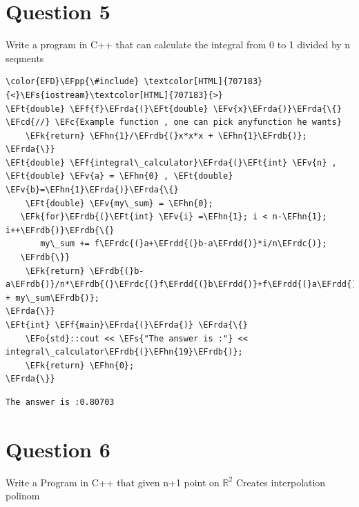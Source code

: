 \documentclass[11pt]{article}
\newcommand{\EFc}[1]{\textcolor{EFc}{#1}} %
\newcommand{\EFcd}[1]{\textcolor{EFcd}{#1}} %
\newcommand{\EFs}[1]{\textcolor{EFs}{#1}} %
\newcommand{\EFk}[1]{\textcolor{EFk}{#1}} %
\newcommand{\EFf}[1]{\textcolor{EFf}{#1}} %
\newcommand{\EFv}[1]{\textcolor{EFv}{#1}} %
\newcommand{\EFt}[1]{\textcolor{EFt}{#1}} %
\newcommand{\EFo}[1]{\textcolor{EFo}{#1}} %
\newcommand{\EFpp}[1]{\textcolor{EFpp}{#1}} %
\newcommand{\EFhn}[1]{\textcolor{EFhn}{#1}} %
\newcommand{\EFrda}[1]{\textcolor{EFrda}{#1}} %
\newcommand{\EFrdb}[1]{\textcolor{EFrdb}{#1}} %
\newcommand{\EFrdc}[1]{\textcolor{EFrdc}{#1}} %
\newcommand{\EFrdd}[1]{\textcolor{EFrdd}{#1}} %
\begin{document}
\newpage
\section{Question 5}
\label{sec:org77fab99}
Write a program in C++ that can calculate the integral from 0 to 1 divided by n seqments

\begin{Code}
\begin{Verbatim}
\color{EFD}\EFpp{\#include} \textcolor[HTML]{707183}{<}\EFs{iostream}\textcolor[HTML]{707183}{>}
\EFt{double} \EFf{f}\EFrda{(}\EFt{double} \EFv{x}\EFrda{)}\EFrda{\{} \EFcd{//} \EFc{Example function , one can pick anyfunction he wants}
    \EFk{return} \EFhn{1}/\EFrdb{(}x*x*x + \EFhn{1}\EFrdb{)};
\EFrda{\}}
\EFt{double} \EFf{integral\_calculator}\EFrda{(}\EFt{int} \EFv{n} , \EFt{double} \EFv{a} = \EFhn{0} , \EFt{double} \EFv{b}=\EFhn{1}\EFrda{)}\EFrda{\{}
    \EFt{double} \EFv{my\_sum} = \EFhn{0};
   \EFk{for}\EFrdb{(}\EFt{int} \EFv{i} =\EFhn{1}; i < n-\EFhn{1}; i++\EFrdb{)}\EFrdb{\{}
       my\_sum += f\EFrdc{(}a+\EFrdd{(}b-a\EFrdd{)}*i/n\EFrdc{)};
   \EFrdb{\}}
    \EFk{return} \EFrdb{(}b-a\EFrdb{)}/n*\EFrdb{(}\EFrdc{(}f\EFrdd{(}b\EFrdd{)}+f\EFrdd{(}a\EFrdd{)}\EFrdc{)}/\EFhn{2} + my\_sum\EFrdb{)};
\EFrda{\}}
\EFt{int} \EFf{main}\EFrda{(}\EFrda{)} \EFrda{\{}
    \EFo{std}::cout << \EFs{"The answer is :"} << integral\_calculator\EFrdb{(}\EFhn{19}\EFrdb{)};
    \EFk{return} \EFhn{0};
\EFrda{\}}

\end{Verbatim}
\end{Code}

\begin{verbatim}
The answer is :0.80703
\end{verbatim}
\section{Question 6}
\label{sec:org822426f}
Write a Program in C++ that given n+1 point on \(\mathbb{R}^2\) Creates interpolation polinom
\newpage
\end{document}
